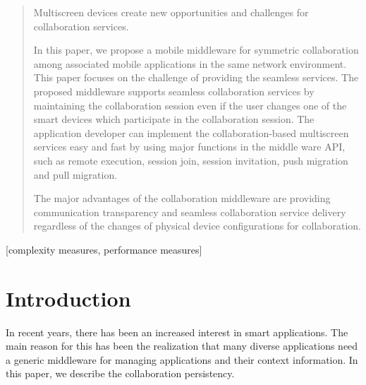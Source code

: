 \documentclass{sig-alternate}
\begin{document}

\maketitle
\begin{abstract}
Multiscreen devices create new opportunities and challenges for collaboration services.

In this paper, we propose a mobile middleware for symmetric collaboration among associated mobile applications in the same network environment. 
This paper focuses on the challenge of providing the seamless services. 
The proposed middleware supports seamless collaboration services by maintaining the collaboration session even if the user changes one of the smart devices which participate in the collaboration session. 
The application developer can implement the collaboration-based multiscreen services easy and fast by using major functions in the middle ware API, such as remote execution, session join, session invitation,  push migration and pull migration. 

The major advantages of the collaboration middleware are providing communication transparency and seamless collaboration service delivery regardless of the changes of physical device configurations for collaboration.

\end{abstract}

[complexity measures, performance measures]



\section{Introduction}
In recent years, there has been an increased interest in smart applications. The main reason for this has been the realization that many diverse applications need a generic middleware for managing applications and their context information. In this paper, we describe the collaboration persistency. 
\end{document}
